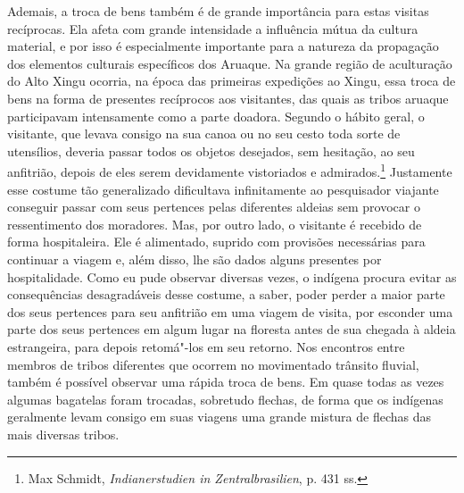 Ademais, a troca de bens também é de grande importância para estas
visitas recíprocas. Ela afeta com grande intensidade a influência mútua
da cultura material, e por isso é especialmente importante para a
natureza da propagação dos elementos culturais específicos dos Aruaque.
Na grande região de aculturação do Alto Xingu ocorria, na época das
primeiras expedições ao Xingu, essa troca de bens na forma de presentes
recíprocos aos visitantes, das quais as tribos aruaque participavam
intensamente como a parte doadora. Segundo o hábito geral, o
visitante, que levava consigo na sua canoa ou no seu cesto toda sorte
de utensílios, deveria passar todos os objetos desejados, sem hesitação,
ao seu anfitrião, depois de eles serem devidamente vistoriados e
admirados.\footnote{Max Schmidt, \emph{Indianerstudien in
  Zentralbrasilien}, p. 431 ss.} Justamente esse costume tão
generalizado dificultava infinitamente ao pesquisador viajante conseguir
passar com seus pertences pelas diferentes aldeias sem provocar o
ressentimento dos moradores. Mas, por outro lado, o visitante é recebido
de forma hospitaleira. Ele é alimentado, suprido com provisões
necessárias para continuar a viagem e, além disso, lhe são dados alguns
presentes por hospitalidade. Como eu pude observar diversas vezes, o
indígena procura evitar as consequências desagradáveis desse costume, a
saber, poder perder a maior parte dos seus pertences para seu anfitrião
em uma viagem de visita, por esconder uma parte dos seus pertences em
algum lugar na floresta antes de sua chegada à aldeia estrangeira, para
depois retomá"-los em seu retorno. Nos encontros entre membros de tribos
diferentes que ocorrem no movimentado trânsito fluvial, também é
possível observar uma rápida troca de bens. Em quase todas as vezes
algumas bagatelas foram trocadas, sobretudo flechas, de forma que os
indígenas geralmente levam consigo em suas viagens uma grande mistura de
flechas das mais diversas tribos.


